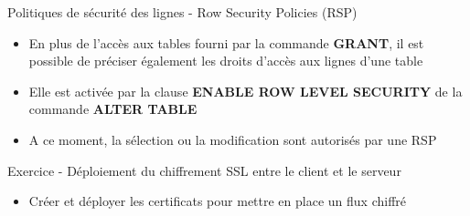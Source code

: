 
\begin{frame}[fragile]{Politiques de sécurité des lignes - Row Security Policies (RSP)}

   \begin{itemize}
      \item En plus de l'accès aux tables fourni par la commande \textbf{GRANT}, il est possible de préciser également les droits d'accès aux lignes d'une table
      \item Elle est activée par la clause \textbf{ENABLE ROW LEVEL SECURITY} de la commande \textbf{ALTER TABLE}
      \item A ce moment, la sélection ou la modification sont autorisés par une RSP
   \end{itemize}

\begin{toile}
\end{toile}

\end{frame}


\begin{frame}[fragile]{Exercice - Déploiement du chiffrement SSL entre le client et le serveur}

   \begin{itemize}
      \item Créer et déployer les certificats pour mettre en place un flux chiffré
   \end{itemize}

\begin{toile}
\end{toile}

\end{frame}

